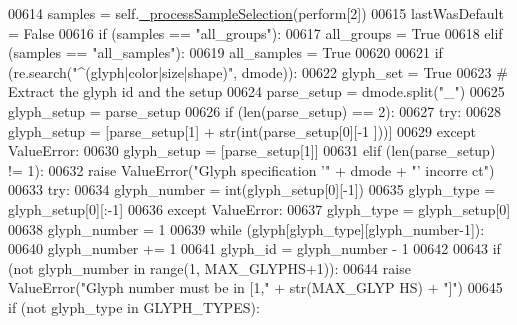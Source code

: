 \begin{DoxyCode}
00614                 samples = self.\hyperlink{classnavicom_1_1navicom_1_1NaviCom_a2acd087f6c61dc8c7e1bc5a3391ff982}{_processSampleSelection}(perform[2])
00615                 lastWasDefault = \textcolor{keyword}{False}
00616             \textcolor{keywordflow}{if} (samples == \textcolor{stringliteral}{"all\_groups"}):
00617                 all\_groups = \textcolor{keyword}{True}
00618             \textcolor{keywordflow}{elif} (samples == \textcolor{stringliteral}{"all\_samples"}):
00619                 all\_samples = \textcolor{keyword}{True}
00620 
00621             \textcolor{keywordflow}{if} (re.search(\textcolor{stringliteral}{"^(glyph|color|size|shape)"}, dmode)):
00622                 glyph\_set = \textcolor{keyword}{True}
00623                 \textcolor{comment}{# Extract the glyph id and the setup}
00624                 parse\_setup = dmode.split(\textcolor{stringliteral}{"\_"})
00625                 glyph\_setup = parse\_setup
00626                 \textcolor{keywordflow}{if} (len(parse\_setup) == 2):
00627                     \textcolor{keywordflow}{try}:
00628                         glyph\_setup = [parse\_setup[1] + str(int(parse\_setup[0][-1
      ]))]
00629                     \textcolor{keywordflow}{except} ValueError:
00630                         glyph\_setup = [parse\_setup[1]]
00631                 \textcolor{keywordflow}{elif} (len(parse\_setup) != 1):
00632                     \textcolor{keywordflow}{raise} ValueError(\textcolor{stringliteral}{"Glyph specification '"} + dmode + \textcolor{stringliteral}{"' incorre
      ct"})
00633                 \textcolor{keywordflow}{try}:
00634                     glyph\_number = int(glyph\_setup[0][-1])
00635                     glyph\_type = glyph\_setup[0][:-1]
00636                 \textcolor{keywordflow}{except} ValueError:
00637                     glyph\_type = glyph\_setup[0]
00638                     glyph\_number = 1
00639                     \textcolor{keywordflow}{while} (glyph[glyph\_type][glyph\_number-1]):
00640                         glyph\_number += 1
00641                 glyph\_id = glyph\_number - 1
00642                 
00643                 \textcolor{keywordflow}{if} (\textcolor{keywordflow}{not} glyph\_number \textcolor{keywordflow}{in} range(1, MAX\_GLYPHS+1)):
00644                     \textcolor{keywordflow}{raise} ValueError(\textcolor{stringliteral}{"Glyph number must be in [1,"} + str(MAX\_GLYP
      HS) + \textcolor{stringliteral}{"]"})
00645                 \textcolor{keywordflow}{if} (\textcolor{keywordflow}{not} glyph\_type \textcolor{keywordflow}{in} GLYPH\_TYPES):

\end{DoxyCode}
